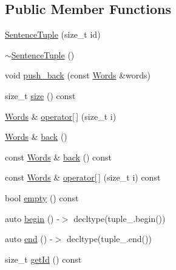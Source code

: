\subsection*{Public Member Functions}
\begin{DoxyCompactItemize}
\item 
\hyperlink{classmarian_1_1data_1_1SentenceTuple_a53dba33c13ccbcc8b3e05bf2a0e4fe06}{Sentence\+Tuple} (size\+\_\+t id)
\item 
\hyperlink{classmarian_1_1data_1_1SentenceTuple_ac361a79106e555ff199ac6db1d1f321b}{$\sim$\+Sentence\+Tuple} ()
\item 
void \hyperlink{classmarian_1_1data_1_1SentenceTuple_a749e5acf8c894f139153f03abafc5ccb}{push\+\_\+back} (const \hyperlink{namespacemarian_a5385eef6e49dd8f789f616ef579dea3f}{Words} \&words)
\item 
size\+\_\+t \hyperlink{classmarian_1_1data_1_1SentenceTuple_a9b37c6147029e8c2f1f1c595a2a586bf}{size} () const 
\item 
\hyperlink{namespacemarian_a5385eef6e49dd8f789f616ef579dea3f}{Words} \& \hyperlink{classmarian_1_1data_1_1SentenceTuple_aca744f3dd385b7dfd4d227e5f8bc069e}{operator\mbox{[}$\,$\mbox{]}} (size\+\_\+t i)
\item 
\hyperlink{namespacemarian_a5385eef6e49dd8f789f616ef579dea3f}{Words} \& \hyperlink{classmarian_1_1data_1_1SentenceTuple_af3d4f7ca49cf6d7b50c452cf540a1ef3}{back} ()
\item 
const \hyperlink{namespacemarian_a5385eef6e49dd8f789f616ef579dea3f}{Words} \& \hyperlink{classmarian_1_1data_1_1SentenceTuple_aa9ac44b432ebb3a219f7d7fbfbed5c0a}{back} () const 
\item 
const \hyperlink{namespacemarian_a5385eef6e49dd8f789f616ef579dea3f}{Words} \& \hyperlink{classmarian_1_1data_1_1SentenceTuple_a93d5b03fa677c1ce7bfdccfa009d5ab5}{operator\mbox{[}$\,$\mbox{]}} (size\+\_\+t i) const 
\item 
bool \hyperlink{classmarian_1_1data_1_1SentenceTuple_a8a06101b2aa23aa9c93f414c93f1e618}{empty} () const 
\item 
auto \hyperlink{classmarian_1_1data_1_1SentenceTuple_ad7fd707bbf2eadcbe8c665b334ec0c38}{begin} () -\/$>$ decltype(tuple\+\_\+.\+begin())
\item 
auto \hyperlink{classmarian_1_1data_1_1SentenceTuple_a5556b2b70f347a64af8dc31c9d677636}{end} () -\/$>$ decltype(tuple\+\_\+.\+end())
\item 
size\+\_\+t \hyperlink{classmarian_1_1data_1_1SentenceTuple_a3ddb9241a86b88d8461a83bce1727f34}{get\+Id} () const 
\end{DoxyCompactItemize}
